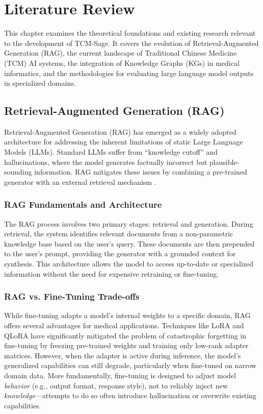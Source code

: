 \chapter{Literature Review}

This chapter examines the theoretical foundations and existing research relevant to the development of TCM-Sage. It covers the evolution of Retrieval-Augmented Generation (RAG), the current landscape of Traditional Chinese Medicine (TCM) AI systems, the integration of Knowledge Graphs (KGs) in medical informatics, and the methodologies for evaluating large language model outputs in specialized domains.

\section{Retrieval-Augmented Generation (RAG)}

Retrieval-Augmented Generation (RAG) has emerged as a widely adopted architecture for addressing the inherent limitations of static Large Language Models (LLMs). Standard LLMs suffer from ``knowledge cutoff'' and hallucinations, where the model generates factually incorrect but plausible-sounding information. RAG mitigates these issues by combining a pre-trained generator with an external retrieval mechanism \cite{lewis2020rag}.

\subsection{RAG Fundamentals and Architecture}

The RAG process involves two primary stages: retrieval and generation. During retrieval, the system identifies relevant documents from a non-parametric knowledge base based on the user's query. These documents are then prepended to the user's prompt, providing the generator with a grounded context for synthesis. This architecture allows the model to access up-to-date or specialized information without the need for expensive retraining or fine-tuning.

\subsection{RAG vs. Fine-Tuning Trade-offs}

While fine-tuning adapts a model's internal weights to a specific domain, RAG offers several advantages for medical applications. Techniques like LoRA and QLoRA have significantly mitigated the problem of catastrophic forgetting in fine-tuning by freezing pre-trained weights and training only low-rank adapter matrices. However, when the adapter is active during inference, the model's generalized capabilities can still degrade, particularly when fine-tuned on narrow domain data. More fundamentally, fine-tuning is designed to adjust model \textit{behavior} (e.g., output format, response style), not to reliably inject new \textit{knowledge}---attempts to do so often introduce hallucination or overwrite existing capabilities.

